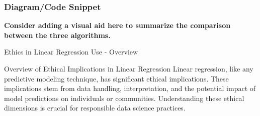\documentclass[aspectratio=169]{beamer}
\begin{document}
\begin{frame}[fragile]
    \frametitle{Diagram/Code Snippet}
    \textbf{Consider adding a visual aid here to summarize the comparison between the three algorithms.}
\end{frame}

\begin{frame}[fragile]{Ethics in Linear Regression Use - Overview}
    \begin{block}{Overview of Ethical Implications in Linear Regression}
        Linear regression, like any predictive modeling technique, has significant ethical implications. These implications stem from data handling, interpretation, and the potential impact of model predictions on individuals or communities. Understanding these ethical dimensions is crucial for responsible data science practices.
    \end{block}
\end{frame}
\end{document}
